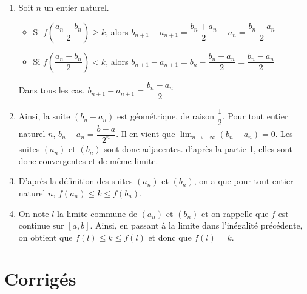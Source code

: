 \documentclass[11pt,fleqn, openany]{book} %
\begin{document}
\begin{solution}
\begin{enumerate}
\item Soit $n$ un entier naturel.
\begin{itemize}
\item Si $ f\left(\dfrac{a_n+b_n}{2}\right) \geqslant k$, alors $b_{n+1}-a_{n+1}=\dfrac{b_n+a_n}{2}-a_n=\dfrac{b_n-a_n}{2}$
\item Si $ f\left(\dfrac{a_n+b_n}{2}\right) < k$, alors $b_{n+1}-a_{n+1}=b_n-\dfrac{b_n+a_n}{2}=\dfrac{b_n-a_n}{2}$
\end{itemize}
Dans tous les cas, $b_{n+1}-a_{n+1}=\dfrac{b_n-a_n}{2}$
\item Ainsi, la suite $(b_n-a_n)$ est géométrique, de raison $\dfrac{1}{2}$. Pour tout entier naturel $n$, $b_n-a_n=\dfrac{b-a}{2^n}$. Il en vient que $\displaystyle\lim_{n \to + \infty}(b_n-a_n)=0$. Les suites $(a_n)$ et $(b_n)$ sont donc adjacentes. d'après la partie 1, elles sont donc convergentes et de même limite.
\item D'après la définition des suites $(a_n)$ et $(b_n)$, on a que pour tout entier naturel $n$, $f(a_n) \leqslant k \leqslant f(b_n)$.
\item On note $l$ la limite commune de $(a_n)$ et $(b_n)$ et on rappelle que $f$ est continue sur $[a,b]$. Ainsi, en passant à la limite dans l'inégalité précédente, on obtient que $f(l) \leqslant k \leqslant f(l)$ et donc que $f(l)=k$.
\end{enumerate}

\end{solution}


\chapter{Corrigés}


\printsolutions[headings={false} ]
\end{document}
